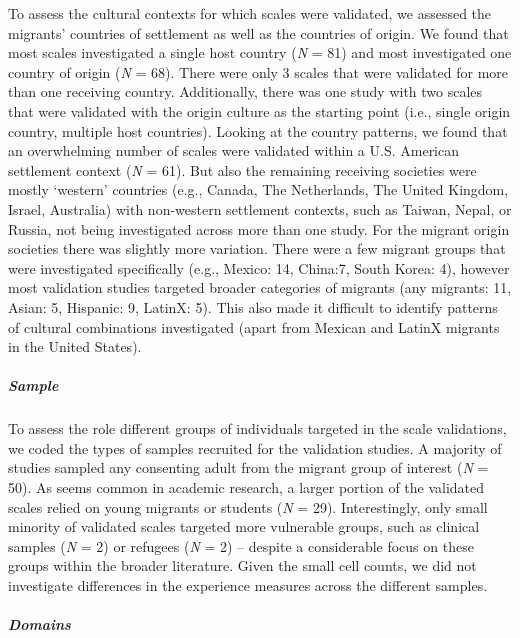 To assess the cultural contexts for which scales were validated, we
assessed the migrants' countries of settlement as well as the countries
of origin. We found that most scales investigated a single host country
(\textit{N} = 81) and most investigated one country of origin
(\textit{N} = 68). There were only 3 scales that were validated for more
than one receiving country. Additionally, there was one study with two
scales that were validated with the origin culture as the starting point
(i.e., single origin country, multiple host countries). Looking at the
country patterns, we found that an overwhelming number of scales were
validated within a U.S. American settlement context (\textit{N} = 61).
But also the remaining receiving societies were mostly `western'
countries (e.g., Canada, The Netherlands, The United Kingdom, Israel,
Australia) with non-western settlement contexts, such as Taiwan, Nepal,
or Russia, not being investigated across more than one study. For the
migrant origin societies there was slightly more variation. There were a
few migrant groups that were investigated specifically (e.g., Mexico:
14, China:7, South Korea: 4), however most validation studies targeted
broader categories of migrants (any migrants: 11, Asian: 5, Hispanic: 9,
LatinX: 5). This also made it difficult to identify patterns of cultural
combinations investigated (apart from Mexican and LatinX migrants in the
United States).

\subparagraph{Sample}

To assess the role different groups of individuals targeted in the scale
validations, we coded the types of samples recruited for the validation
studies. A majority of studies sampled any consenting adult from the
migrant group of interest (\textit{N} = 50). As seems common in academic
research, a larger portion of the validated scales relied on young
migrants or students (\textit{N} = 29). Interestingly, only small
minority of validated scales targeted more vulnerable groups, such as
clinical samples (\textit{N} = 2) or refugees (\textit{N} = 2) --
despite a considerable focus on these groups within the broader
literature. Given the small cell counts, we did not investigate
differences in the experience measures across the different samples.

\subparagraph{Domains}

